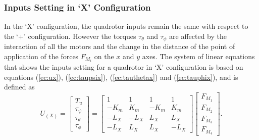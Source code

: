\subsubsection{Inputs Setting in `X' Configuration}
In the `X' configuration, the quadrotor inputs remain the same with respect to the `+' configuration. However the torques $\tau_\theta$ and $\tau_\phi$ are affected by the interaction of all the motors and the change in the distance of the point of application of the forces $F_{M_i}$ on the $x$ and $y$ axes. The system of linear equations that shows the inputs setting for a quadrotor in `X' configuration is based on equations (\ref{ec:ux}), (\ref{ec:taupsix}), (\ref{ec:tauthetax}) and (\ref{ec:tauphix}), and is defined as
\begin{equation}
	U_{(X)} = \begin{bmatrix}
	T_u\\[5pt]
	\tau_{\psi}\\[5pt]
	\tau_{\theta}\\[5pt]
	\tau_{\phi}
	\end{bmatrix} = \begin{bmatrix}
	1 & 1 & 1 & 1 \\[5pt]
	-K_{m} & K_{m} & -K_{m} & K_{m}\\[5pt]
	-L_{X} & -L_{X} & L_{X} & L_{X}\\[5pt]
	-L_{X} & L_{X} & L_{X} & -L_{X}
							\end{bmatrix}
\begin{bmatrix}
F_{M_1}\\[5pt]
F_{M_2}\\[5pt]
F_{M_3}\\[5pt]
F_{M_4}
\end{bmatrix}.
	\label{ec:U_X}						
\end{equation}

